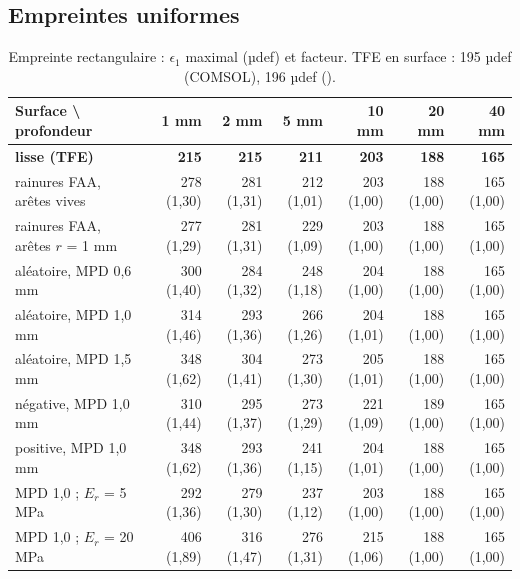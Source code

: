 \subsection{Empreintes uniformes}
\begin{table}[H]\centering\footnotesize
\caption{Empreinte rectangulaire : $\epsilon_1$ maximal (µdef) et facteur. TFE en surface : 195 µdef (COMSOL), 196 µdef (\cs).}\label{tab:rect_e1}
\begin{tabular}{lrrrrrr}
\toprule
Surface \textbackslash{} profondeur & 1 mm & 2 mm & 5 mm & 10 mm & 20 mm & 40 mm\\
\midrule
\textbf{lisse (TFE)} & \textbf{215} & \textbf{215} & \textbf{211} & \textbf{203} & \textbf{188} & \textbf{165}\\ \midrule
rainures FAA, arêtes vives & 278 (1,30) & 281 (1,31) & 212 (1,01) & 203 (1,00) & 188 (1,00) & 165 (1,00)\\
rainures FAA, arêtes $r$ = 1 mm & 277 (1,29) & 281 (1,31) & 229 (1,09) & 203 (1,00) & 188 (1,00) & 165 (1,00)\\
aléatoire, MPD 0,6 mm & 300 (1,40) & 284 (1,32) & 248 (1,18) & 204 (1,00) & 188 (1,00) & 165 (1,00)\\
aléatoire, MPD 1,0 mm & 314 (1,46) & 293 (1,36) & 266 (1,26) & 204 (1,01) & 188 (1,00) & 165 (1,00)\\
aléatoire, MPD 1,5 mm & 348 (1,62) & 304 (1,41) & 273 (1,30) & 205 (1,01) & 188 (1,00) & 165 (1,00)\\
négative, MPD 1,0 mm & 310 (1,44) & 295 (1,37) & 273 (1,29) & 221 (1,09) & 189 (1,00) & 165 (1,00)\\
positive, MPD 1,0 mm & 348 (1,62) & 293 (1,36) & 241 (1,15) & 204 (1,01) & 188 (1,00) & 165 (1,00)\\
MPD 1,0 ; $E_r$ = 5 MPa & 292 (1,36) & 279 (1,30) & 237 (1,12) & 203 (1,00) & 188 (1,00) & 165 (1,00)\\
MPD 1,0 ; $E_r$ = 20 MPa & 406 (1,89) & 316 (1,47) & 276 (1,31) & 215 (1,06) & 188 (1,00) & 165 (1,00)\\
\bottomrule
\end{tabular}
\end{table}

